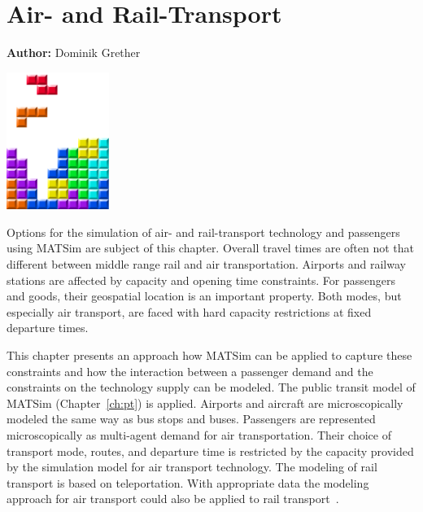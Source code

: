 \chapter{Air- and Rail-Transport}
\label{ch:air}

\hfill \textbf{Author:} Dominik Grether

\begin{center} \includegraphics[width=0.25\textwidth, angle=0]{figures/MATSimBook.png} \end{center}


Options for the simulation of air- and rail-transport technology and passengers using MATSim are subject of this chapter. 
Overall travel times are often not that different between middle range rail and air transportation. 
Airports and railway stations are affected by capacity and opening time constraints. 
For passengers and goods, their geospatial location is an important property. 
Both modes, but especially air transport, are faced with hard capacity restrictions at fixed departure times. 

This chapter presents an approach how MATSim can be applied to capture these constraints and how the interaction between a passenger demand and the constraints on the technology supply can be modeled. 
The public transit model of MATSim (Chapter~\ref{ch:pt}) is applied. %
Airports and aircraft are microscopically modeled the same way as bus stops and buses. 
Passengers are represented microscopically as multi-agent demand for air transportation. 
Their choice of transport mode, routes, and departure time is restricted by the capacity provided by the simulation model for air transport technology. 
The modeling of rail transport is based on teleportation. 
With appropriate data the modeling approach for air transport could also be applied to rail transport~\citep{Quick2012BARailTraffic}.  

